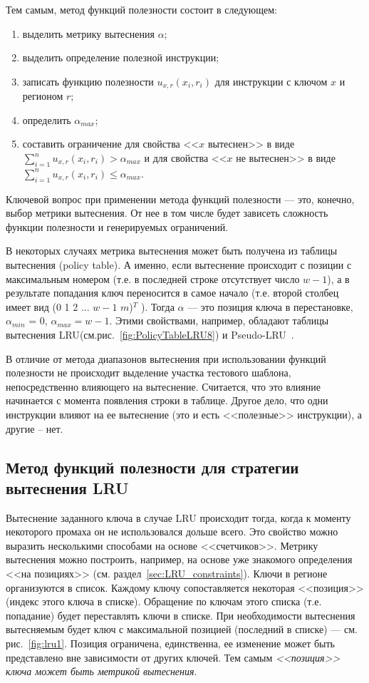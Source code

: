 \documentclass[14pt]{extreport}
\newcommand{\LRU}{\textsf{LRU}\xspace}
\newcommand{\PseudoLRU}{\textsf{Pseudo-LRU}\xspace}
\begin{document}
Тем самым, метод функций полезности состоит в следующем:
\begin{enumerate}
  \item выделить метрику вытеснения $\alpha$;
  \item выделить определение полезной инструкции;
  \item записать функцию полезности $u_{x,r}(x_i, r_i)$ для инструкции с ключом
$x$ и регионом $r$;
  \item определить $\alpha_{max}$;
  \item составить ограничение для свойства <<$x$ вытеснен>> в виде
$\sum\limits_{i=1}^n u_{x,r}(x_i, r_i) > \alpha_{max}$ и для свойства <<$x$ не
вытеснен>> в виде $\sum\limits_{i=1}^n u_{x,r}(x_i,r_i) \leqslant \alpha_{max}$.
\end{enumerate}

Ключевой вопрос при применении метода функций полезности --- это, конечно, выбор
метрики вытеснения. От нее в том числе будет зависеть сложность функции
полезности и генерируемых ограничений.

В некоторых случаях метрика вытеснения может быть получена из таблицы вытеснения
(policy table). А именно, если вытеснение происходит с позиции с максимальным
номером (т.е. в последней строке отсутствует число $w-1$), а в результате
попадания ключ переносится в самое начало (т.е. второй столбец имеет вид (0 1 2
... $w-1$ $m$)$^T$ ). Тогда $\alpha$ --- это позиция ключа в перестановке,
$\alpha_{min}$ = 0, $\alpha_{max} = w{-}1$. Этими свойствами, например, обладают
таблицы вытеснения \LRU (см.рис.~\ref{fig:PolicyTableLRU8}) и
\PseudoLRU~\cite{policy_tables}.

В отличие от метода диапазонов вытеснения при использовании функций полезности
не происходит выделение участка тестового шаблона, непосредственно влияющего на
вытеснение. Считается, что это влияние начинается с момента появления строки в
таблице. Другое дело, что одни инструкции влияют на ее вытеснение (это и есть
<<полезные>> инструкции), а другие -- нет.


\subsection{Метод функций полезности для стратегии вытеснения \LRU}

Вытеснение заданного ключа в случае \LRU происходит тогда, когда к моменту
некоторого промаха он не использовался дольше всего. Это свойство можно выразить
несколькими способами на основе <<счетчиков>>. Метрику вытеснения можно
построить, например, на основе уже знакомого определения <<на позициях>> (см.
раздел~\ref{sec:LRU_constraints}). Ключи в регионе организуются в список.
Каждому ключу сопоставляется некоторая <<позиция>> (индекс этого ключа в
списке). Обращение по ключам этого списка (т.е. попадание) будет переставлять
ключи в списке. При необходимости вытеснения вытесняемым будет ключ с
максимальной позицией (последний в списке) --- см. рис.~\ref{fig:lru1}. Позиция
ограничена, единственна, ее изменение может быть представлено вне зависимости от
других ключей. Тем самым \emph{<<позиция>> ключа может быть метрикой
вытеснения}.
\end{document}
